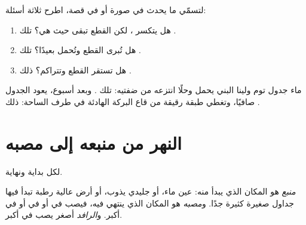 \begin{method}\label{met:g5:water-shapes-the-land:naming}
لتسمّي ما يحدث  في صورة أو في قصة، اطرح ثلاثة
أسئلة:
\begin{enumerate}
  \item هل يتكسر ، لكن القطع تبقى حيث هي؟
        تلك \emph{}.
  \item هل تُبرى القطع وتُحمل بعيدًا؟ تلك
        \emph{}.
  \item هل تستقر القطع وتتراكم؟ ذلك
        \emph{}.
\end{enumerate}
\end{method}

\begin{example}\label{ex:g5:water-shapes-the-land:stream}
ماء جدول توم ولينا البني يحمل وحلًا انتزعه من ضفتيه:
تلك . وبعد أسبوع، يعود الجدول صافيًا، وتغطي طبقة رقيقة
من  قاع البركة الهادئة في طرف الساحة:
ذلك .
\end{example}

\section{النهر من منبعه إلى مصبه}

لكل  بداية ونهاية.

\begin{definition}\label{def:g5:water-shapes-the-land:source-mouth}
\emph{منبع}  هو المكان الذي يبدأ منه: عين ماء، أو
 جليدي يذوب، أو أرض عالية رطبة تبدأ فيها جداول صغيرة كثيرة جدًا.
و\emph{مصبه} هو المكان الذي ينتهي فيه، فيصب في  أو في
 أو في  أكبر. و\emph{الرافد}  أصغر يصب في
 أكبر.
\end{definition}

